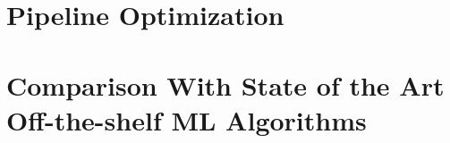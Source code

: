 \documentclass[3p,super,numbers,sort&compress,preprint,10pt]{elsarticle}
\renewcommand{\captionN}[1]{\caption{\color{CadetBlue4!80!black} \sffamily \fontsize{9}{10}\selectfont #1  }}
\def\MXCOL{black}
\begin{document}
%   
  


%   
  




\section{Pipeline Optimization}\label{sec:pipeline}

\clearpage


\tikzexternalenable
\section{Comparison With State of the Art Off-the-shelf ML Algorithms}\label{sec:offtheshelf}
    
% 
\end{document}
